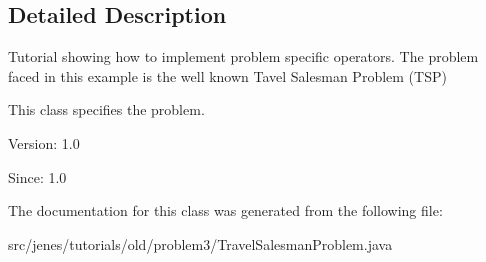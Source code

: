 \subsection{Detailed Description}
Tutorial showing how to implement problem specific operators. The problem faced in this example is the well known Tavel Salesman Problem (TSP)

This class specifies the problem.

\begin{Desc}
\item[Version:]1.0 \end{Desc}
\begin{Desc}
\item[Since:]1.0 \end{Desc}


The documentation for this class was generated from the following file:\begin{CompactItemize}
\item 
src/jenes/tutorials/old/problem3/TravelSalesmanProblem.java\end{CompactItemize}
